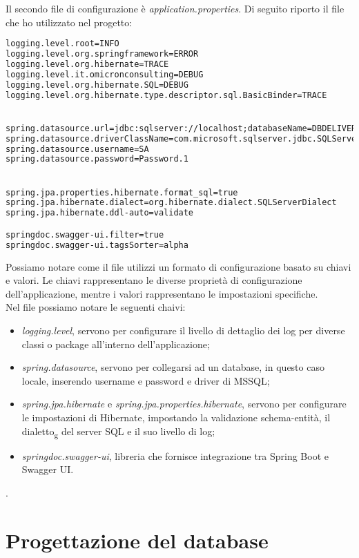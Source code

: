 \noindent Il secondo file di configurazione è \textit{application.properties}. Di seguito riporto il file che ho utilizzato nel progetto:
\begin{lstlisting}[language = XML, caption = application.properties del progetto]
logging.level.root=INFO
logging.level.org.springframework=ERROR
logging.level.org.hibernate=TRACE
logging.level.it.omicronconsulting=DEBUG
logging.level.org.hibernate.SQL=DEBUG
logging.level.org.hibernate.type.descriptor.sql.BasicBinder=TRACE


spring.datasource.url=jdbc:sqlserver://localhost;databaseName=DBDELIVERONE;Trusted_Connection=False;\MultipleActiveResultSets=true;encrypt=true;trustServerCertificate=true;
spring.datasource.driverClassName=com.microsoft.sqlserver.jdbc.SQLServerDriver
spring.datasource.username=SA
spring.datasource.password=Password.1


spring.jpa.properties.hibernate.format_sql=true
spring.jpa.hibernate.dialect=org.hibernate.dialect.SQLServerDialect
spring.jpa.hibernate.ddl-auto=validate

springdoc.swagger-ui.filter=true
springdoc.swagger-ui.tagsSorter=alpha
\end{lstlisting}
Possiamo notare come il file utilizzi un formato di configurazione basato su chiavi e valori. Le chiavi rappresentano le diverse proprietà di configurazione dell'applicazione, mentre i valori rappresentano le impostazioni specifiche.\\
Nel file possiamo notare le seguenti chaivi:
\begin{itemize}
\item \textit{logging.level}, servono per configurare il livello di dettaglio dei log per diverse classi o package all'interno dell'applicazione;
\item \textit{spring.datasource}, servono per collegarsi ad un database, in questo caso locale, inserendo username e password e driver di MSSQL;
\item \textit{spring.jpa.hibernate} e \textit{spring.jpa.properties.hibernate}, servono per configurare le impostazioni di Hibernate, impostando la validazione schema-entità, il dialetto\textsubscript{g} del server SQL e il suo livello di log;
\item \textit{springdoc.swagger-ui}, libreria che fornisce integrazione tra Spring Boot e Swagger UI.  
\end{itemize}. 

\section{Progettazione del database}
